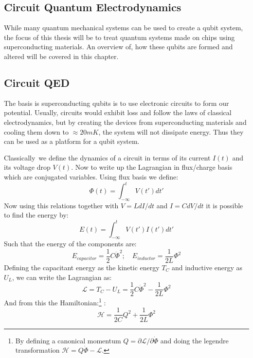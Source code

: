 \begin{fullwidth}
\chapter{Circuit Quantum Electrodynamics}
\end{fullwidth}
While many quantum mechanical systems can be used to create a qubit system, the focus of this thesis will be to treat quantum systems made on chips using superconducting materials. An overview of, how these qubits are formed and altered will be covered in this chapter.\\

\section{Circuit QED}
The basis is superconducting qubits is to use electronic circuits to form our potential. Usually, circuits would exhibit loss and follow the laws of classical electrodynamics, but by creating the devices from superconducting materials and cooling them down to $\approx 20 \unit{mK}$, the system will not dissipate energy. Thus they can be used as a platform for a qubit system.

Classically\, we define the dynamics of a circuit in terms of its current $I(t)$ and its voltage drop $V(t)$. Now to write up the Lagrangian in flux/charge basis which are conjugated variables. Using flux basis we define:
\begin{equation}
    \Phi (t) = \int_{-\infty}^t V(t')dt'
\end{equation}
Now using this relations together with $V = L dI/dt$ and $I = C dV/dt$ it is possible to find the energy by:
\begin{equation}\label{eq: Energy from current and voltage}
    E(t) = \int_{-\infty}^t V(t')I(t')dt'
\end{equation}
Such that the energy of the components are:
\begin{equation}
    E_{capacitor} = \frac12 C \dot{\Phi}^2; \quad E_{inductor} = \frac{1}{2L} \Phi^2
\end{equation}
Defining the capacitant energy as the kinetic energy $T_C$ and inductive energy as $U_L$, we can write the Lagrangian as:
\begin{equation}
    \mathcal{L} = T_C - U_L = \frac12 C \dot{\Phi}^2 - \frac{1}{2L} \Phi^2
\end{equation}
And from this the Hamiltonian:\footnote{By defining a canonical momentum $Q = \partial \mathcal{L} / \partial \dot{\Phi}$ and doing the legendre transformation $\mathcal{H} = Q\dot{\Phi} - \mathcal{L}$.} \cite{krantz_quantum_2019}:
\begin{equation}
    \mathcal{H} = \frac{1}{2C} Q^2 + \frac{1}{2L} \Phi^2
\end{equation}

